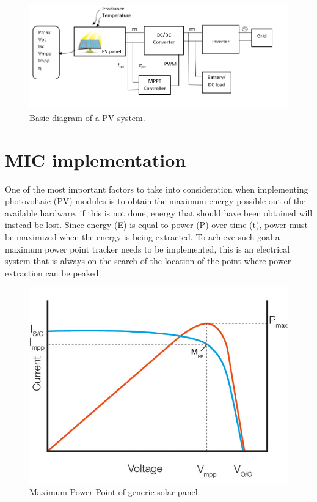 \begin{figure}[htbp]
	\includegraphics[width=\linewidth]{../Pictures/PV_system_blocks}
	\caption{Basic diagram of a PV system.}
	\label{fig:PVsystemblocks}
\end{figure}


\newpage

\section{MIC implementation}
One of the most important factors to take into consideration when implementing photovoltaic (PV) modules is to obtain the maximum energy possible out of the available hardware, if this is not done, energy that should have been obtained will instead be lost. Since energy (E) is equal to power (P) over time (t), power must be maximized when the energy is being extracted. To achieve such goal a maximum power point tracker needs to be implemented, this is an electrical system that is always on the search of the location of the point where power extraction can be peaked. 
\begin{figure}[htbp]
	\begin{center}
	\includegraphics[width=0.7\linewidth]{../Pictures/mpp_graph.jpg}
	\caption{Maximum Power Point of generic solar panel.}
	\label{fig:mpp}
	\end{center}
\end{figure}

